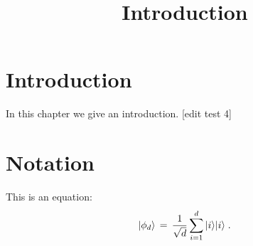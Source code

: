 

%


\title{Introduction}


\maketitle

\label{section-phantom}

\tableofcontents

\section{Introduction}
\label{section:introduction}

In this chapter we give an introduction. [edit test 4]

\section{Notation}
\label{section-notation}

This is an equation:
\begin{equation}
\label{eq:me-state}
 |\phi_d\rangle \,=\,\frac{1}{\sqrt{d}} \sum_{i=1}^d |i\rangle|i\rangle\;.
\end{equation}









